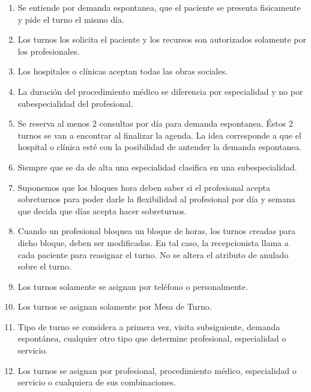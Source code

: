 \documentclass[a4paper,11pt]{article}
\begin{document}
\begin{enumerate}

    \item Se entiende por demanda espontanea, que el paciente se presenta 
    fisicamente y pide el turno el mismo día.
    
    \item Los turnos los solicita el paciente y los recursos son autorizados 
    solamente por los profesionales.
    
    \item Los hospitales o clínicas aceptan todas las obras sociales.
    
    \item La duración del procedimiento médico se diferencia por especialidad
    y no por subespecialidad del profesional.
    
    \item Se reserva al menos 2 consultas por día para demanda espontanea.
    Éstos 2 turnos se van a encontrar al finalizar la agenda. La idea corresponde
    a que el hospital o clínica esté con la posibilidad de antender la demanda
    espontanea.
    
    \item Siempre que se da de alta una especialidad clasifica en una subespecialidad.
    
    \item Suponemos que los bloques hora deben saber si el profesional acepta 
    sobreturnos para poder darle la flexibilidad al profesional por día y semana 
    que decida que días acepta hacer sobreturnos.
    
    \item Cuando un profesional bloquea un bloque de horas, los turnos creadas 
    para dicho bloque, deben ser modificadas. En tal caso, la recepcionista llama
    a cada paciente para reasignar el turno. No se altera el atributo de anulado 
    sobre el turno.
    
    \item Los turnos solamente se asignan por teléfono o personalmente.
    
    \item Los turnos se asignan solamente por Mesa de Turno.
    
    \item Tipo de turno se considera a primera vez, visita subsiguiente, demanda 
    espontánea, cualquier otro 
    tipo que determine profesional, especialidad o servicio.
    
    \item Los turnos se asignan por profesional, procedimiento médico, especialidad
    o servicio o cualquiera de sus combinaciones.
    

\end{enumerate}
\end{document}
